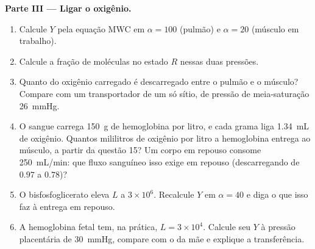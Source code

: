 \begin{problem}
\medskip
\noindent\textbf{Parte III --- Ligar o oxigênio.}
\begin{enumerate}[resume]
  \item Calcule $Y$ pela equação MWC em $\alpha = 100$ (pulmão) e
        $\alpha = 20$ (músculo em trabalho).
  \item Calcule a fração de moléculas no estado $R$ nessas duas
        pressões.
  \item Quanto do oxigênio carregado é descarregado entre o pulmão e o
        músculo? Compare com um transportador de um só sítio, de
        pressão de meia-saturação \qty{26}{mmHg}.
  \item O sangue carrega \qty{150}{g} de hemoglobina por litro, e cada
        grama liga \qty{1.34}{mL} de oxigênio. Quantos mililitros de
        oxigênio por litro a hemoglobina entrega ao músculo, a partir
        da questão 15? Um corpo em repouso consome \qty{250}{mL/min}:
        que fluxo sanguíneo isso exige em repouso (descarregando de
        $0.97$ a $0.78$)?
  \item O bisfosfoglicerato eleva $L$ a $3\times 10^{6}$. Recalcule $Y$
        em $\alpha = 40$ e diga o que isso faz à entrega em repouso.
  \item A hemoglobina fetal tem, na prática, $L = 3\times 10^{4}$.
        Calcule seu $Y$ à pressão placentária de \qty{30}{mmHg},
        compare com o da mãe e explique a transferência.
\end{enumerate}


\end{problem}
